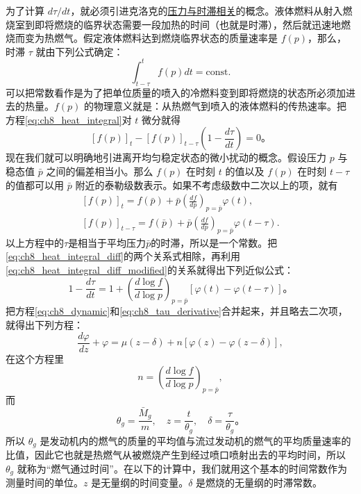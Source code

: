 为了计算 $ d\tau/dt $，就必须引进克洛克的\underline{压力与时滞相关}的概念。液体燃料从射入燃烧室到即将燃烧的临界状态需要一段加热的时间（也就是时滞），然后就迅速地燃烧而变为热燃气。假定液体燃料达到燃烧临界状态的质量速率是 $ f(p) $，那么，时滞 $ \tau $ 就由下列公式确定：
\begin{equation}\label{eq:ch8_heat_integral}
\int_{t-\tau}^t f(p) dt = \text{const.}
\end{equation}
可以把常数看作是为了把单位质量的喷入的冷燃料变到即将燃烧的状态所必须加进去的热量。$ f(p) $ 的物理意义就是：从热燃气到喷入的液体燃料的传热速率。把方程\eqref{eq:ch8_heat_integral}对 $ t $ 微分就得
\begin{equation}\label{eq:ch8_heat_integral_diff}
[f(p)]_t - [f(p)]_{t-\tau} \left(1 - \frac{d\tau}{dt}\right) = 0。
\tag{*}
\end{equation}
现在我们就可以明确地引进离开均匀稳定状态的微小扰动的概念。假设压力 $ p $ 与稳态值 $ \bar{p} $ 之间的偏差相当小。那么 $ f(p) $ 在时刻 $ t $ 的值以及 $ f(p) $ 在时刻 $ t-\tau $ 的值都可以用 $ \bar{p} $ 附近的泰勒级数表示。如果不考虑级数中二次以上的项，就有
\begin{equation}\label{eq:ch8_heat_integral_diff_modified}
\begin{array}{l}
[f(p)]_t = f(\bar{p}) + \bar{p} \left( \frac{df}{dp} \right)_{p=\bar{p}} \varphi(t),\\
{[f(p)]}_{t-\tau} = f(\bar{p}) + \bar{p} \left( \frac{df}{dp} \right)_{p=\bar{p}} \varphi(t-\tau).
\end{array}
\tag{**}
\end{equation}
以上方程中的$\tau$是相当于平均压力$\bar{p}$的时滞，所以是一个常数。把\eqref{eq:ch8_heat_integral_diff}的两个关系式相除，再利用\eqref{eq:ch8_heat_integral_diff_modified}的关系就得出下列近似公式：
\begin{equation}\label{eq:ch8_tau_derivative}
1 - \frac{d\tau}{dt} = 1 + \left( \frac{d\log f}{d\log p} \right)_{p=\bar{p}} \left[ \varphi(t) - \varphi(t-\tau) \right]。
\end{equation}
把方程\eqref{eq:ch8_dynamic}和\eqref{eq:ch8_tau_derivative}合并起来，并且略去二次项，就得出下列方程：
\begin{equation}\label{eq:ch8_dimensionless_eq}
\frac{d\varphi}{dz} + \varphi = \mu(z-\delta) + n[\varphi(z) - \varphi(z-\delta)],
\end{equation}
在这个方程里
\begin{equation}\label{eq:ch8_n_definition}
n = \left( \frac{d\log f}{d\log p} \right)_{p=\bar{p}},
\end{equation}
而
\begin{equation}\label{eq:ch8_scaling}
\theta_g = \frac{\bar{M}_g}{m}, \quad z = \frac{t}{\theta_g}, \quad \delta = \frac{\tau}{\theta_g}。
\end{equation}
所以 $ \theta_g $ 是发动机内的燃气的质量的平均值与流过发动机的燃气的平均质量速率的比值，因此它也就是热燃气从被燃烧产生到经过喷口喷射出去的平均时间，所以 $ \theta_g $ 就称为“燃气通过时间”。在以下的计算中，我们就用这个基本的时间常数作为测量时间的单位。$ z $ 是无量纲的时间变量。$ \delta $ 是燃烧的无量纲的时滞常数。

